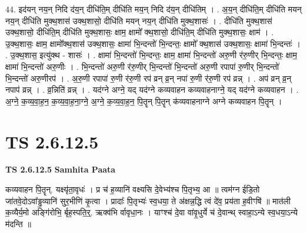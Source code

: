 \documentclass[17pt]{extarticle}
\begin{document}
44. इद॑यन् नय॒न् निदि द॑य॒न् दीधि॑ति॒म् दीधि॑ति मय॒न् निदि द॑य॒न् दीधि॑तिम् । . अ॒य॒न् दीधि॑ति॒म् दीधि॑ति मयन् नय॒न् दीधि॑ति मुक्थ॒शास॑ उक्थ॒शासो॒ दीधि॑ति मयन् नय॒न् दीधि॑ति मुक्थ॒शासः॑ । . दीधि॑ति मुक्थ॒शास॑ उक्थ॒शासो॒ दीधि॑ति॒म् दीधि॑ति मुक्थ॒शासः॒ क्षाम॒ क्षामो᳚ क्थ॒शासो॒ दीधि॑ति॒म् दीधि॑ति मुक्थ॒शासः॒ क्षाम॑ । . उ॒क्थ॒शासः॒ क्षाम॒ क्षामो᳚क्थ॒शास॑ उक्थ॒शासः॒ क्षामा॑ भि॒न्दन्तो॑ भि॒न्दन्तः॒ क्षामो᳚ क्थ॒शास॑ उक्थ॒शासः॒ क्षामा॑ भि॒न्दन्तः॑ । . उ॒क्थ॒शास॒ इत्यु॑क्थ - शासः॑ । . क्षामा॑ भि॒न्दन्तो॑ भि॒न्दन्तः॒ क्षाम॒ क्षामा॑ भि॒न्दन्तो॑ अरु॒णी र॑रु॒णीर् भि॒न्दन्तः॒ क्षाम॒ क्षामा॑ भि॒न्दन्तो॑ अरु॒णीः । . भि॒न्दन्तो॑ अरु॒णी र॑रु॒णीर् भि॒न्दन्तो॑ भि॒न्दन्तो॑ अरु॒णी रपापा॑ रु॒णीर् भि॒न्दन्तो॑ भि॒न्दन्तो॑ अरु॒णीरप॑ । . अ॒रु॒णी रपापा॑ रु॒णी र॑रु॒णी रप॑ व्रन् व्र॒न् नपा॑ रु॒णी र॑रु॒णी रप॑ व्रन्न् । . अप॑ व्रन् व्र॒न् नपाप॑ व्रन्न् । . व्र॒न्निति॑ व्रन्न् । . यद॑ग्ने अग्ने॒ यद् यद॑ग्ने कव्यवाहन कव्यवाहनाग्ने॒ यद् यद॑ग्ने कव्यवाहन । . अ॒ग्ने॒ क॒व्य॒वा॒ह॒न॒ क॒व्य॒वा॒ह॒ना॒ग्ने॒ अ॒ग्ने॒ क॒व्य॒वा॒ह॒न॒ पि॒तॄन् पि॒तॄन् क॑व्यवाहनाग्ने अग्ने कव्यवाहन पि॒तॄन् । \newline
\pagebreak
{}

\section{ TS 2.6.12.5 }

\textbf{TS 2.6.12.5 } \newline
\textbf{Samhita Paata} \newline

कव्यवाहन पि॒तॄन्. यक्ष्यृ॑ता॒वृधः॑ । प्र च॑ ह॒व्यानि॑ वक्ष्यसि दे॒वेभ्य॑श्च पि॒तृभ्य॒ आ ॥ त्वम॑ग्न ईडि॒तो जा॑तवे॒दोऽवा᳚ड्ढ॒व्यानि॑ सुर॒भीणि॑ कृ॒त्वा । प्रादाः᳚ पि॒तृभ्यः॑ स्व॒धया॒ ते अ॑क्षन्न॒द्धि त्वं दे॑व॒ प्रय॑ता ह॒वीꣳषि॑ ॥ मात॑ली क॒व्यैर्य॒मो अङ्गि॑रोभि॒ र्बृह॒स्पति॒र्॒. ऋक्व॑भि र्वावृधा॒नः । याꣳश्च॑ दे॒वा वा॑वृ॒धुर्ये च॑ दे॒वान्थ् स्वाहा॒ऽन्ये स्व॒धया॒ऽन्ये म॑दन्ति ॥ \newline
\end{document}
